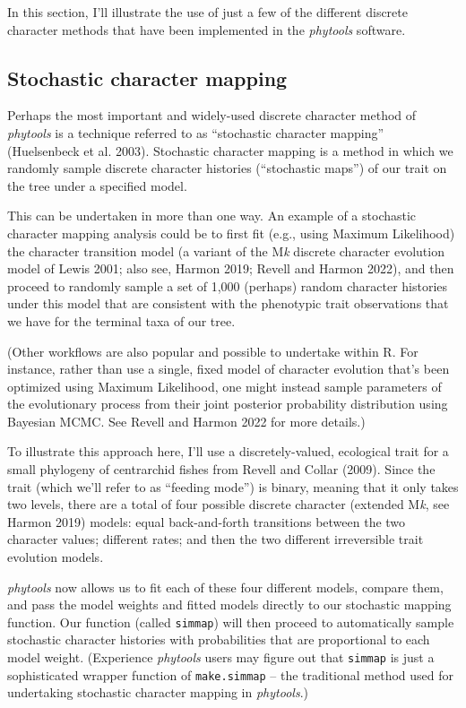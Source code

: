 \documentclass[fleqn,10pt,lineno]{wlpeerj} %
\begin{document}
In this section, I'll illustrate the use of just a few of the different discrete character methods that have been implemented in the \emph{phytools} software.

\hypertarget{stochastic-character-mapping}{%
\subsection{Stochastic character mapping}\label{stochastic-character-mapping}}

Perhaps the most important and widely-used discrete character method of \emph{phytools} is a technique referred to as ``stochastic character mapping'' (Huelsenbeck et al. 2003). Stochastic character mapping is a method in which we randomly sample discrete character histories (``stochastic maps'') of our trait on the tree under a specified model.

This can be undertaken in more than one way. An example of a stochastic character mapping analysis could be to first fit (e.g., using Maximum Likelihood) the character transition model (a variant of the M\emph{k} discrete character evolution model of Lewis 2001; also see, Harmon 2019; Revell and Harmon 2022), and then proceed to randomly sample a set of 1,000 (perhaps) random character histories under this model that are consistent with the phenotypic trait observations that we have for the terminal taxa of our tree.

(Other workflows are also popular and possible to undertake within R. For instance, rather than use a single, fixed model of character evolution that's been optimized using Maximum Likelihood, one might instead sample parameters of the evolutionary process from their joint posterior probability distribution using Bayesian MCMC. See Revell and Harmon 2022 for more details.)

To illustrate this approach here, I'll use a discretely-valued, ecological trait for a small phylogeny of centrarchid fishes from Revell and Collar (2009). Since the trait (which we'll refer to as ``feeding mode'') is binary, meaning that it only takes two levels, there are a total of four possible discrete character (extended M\emph{k}, see Harmon 2019) models: equal back-and-forth transitions between the two character values; different rates; and then the two different irreversible trait evolution models.

\emph{phytools} now allows us to fit each of these four different models, compare them, and pass the model weights and fitted models directly to our stochastic mapping function. Our function (called \texttt{simmap}) will then proceed to automatically sample stochastic character histories with probabilities that are proportional to each model weight. (Experience \emph{phytools} users may figure out that \texttt{simmap} is just a sophisticated wrapper function of \texttt{make.simmap} -- the traditional method used for undertaking stochastic character mapping in \emph{phytools}.)
\end{document}
